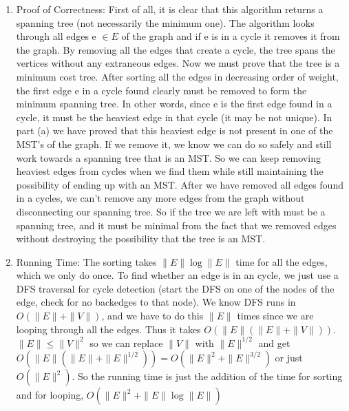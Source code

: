 \documentclass[11pt]{article}
\newenvironment{qparts}{\begin{enumerate}[{(}a{)}]}{\end{enumerate}}
\begin{document}
\begin{qparts}
\item
Proof of Correctness: First of all, it is clear that this algorithm returns a spanning tree (not necessarily the minimum one). The algorithm looks through all edges e $\in E$ of the graph and if e is in a cycle it removes it from the graph. By removing all the edges that create a cycle, the tree spans the vertices without any extraneous edges. Now we must prove that the tree is a minimum cost tree.   After sorting all the edges in decreasing order of weight, the first edge e in a cycle found clearly must be removed to form the minimum spanning tree. In other words, since e is the first edge found in a cycle, it must be the heaviest edge in that cycle (it may be not unique). In part (a) we have proved that this heaviest edge is not present in one of the MST's of the graph. If we remove it, we know we can do so safely and still work towards a spanning tree that is an MST. So we can keep removing heaviest edges from cycles when we find them while still maintaining the possibility of ending up with an MST. After we have removed all edges found in a cycles, we can't remove any more edges from the graph without disconnecting our spanning tree. So if the tree we are left with must be a spanning tree, and it must be minimal from the fact that we removed edges without destroying the possibility that the tree is an MST.
\item
Running Time: The sorting takes $\|E\| \log \|E\|$ time for all the edges, which we only do once. To find whether an edge is in an cycle, we just use a DFS traversal for cycle detection (start the DFS on one of the nodes of the edge, check for no backedges to that node). We know DFS runs in $O(\|E\| + \|V\|)$, and we have to do this $\|E\|$ times since we are looping through all the edges. Thus it takes  $O(\|E\|(\|E\|+ \|V\|))$. $\|E\| \leq \|V\|^2$ so we can replace $\|V\|$ with $\|E\|^{1/2}$ and get $O(\|E\|(\|E\| + \|E\|^{1/2})) =O(\|E\|^2 + \|E\|^{3/2}) $ or just $O(\|E\|^2)$. So the running time is just the addition of the time for sorting and for looping, $O(\|E\|^2 + \|E\| \log \|E\| )$
\end{qparts}
\end{document}
